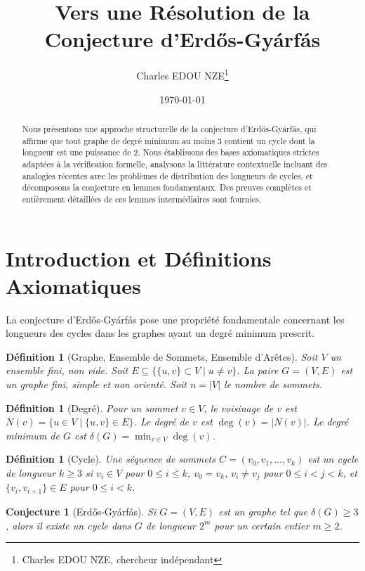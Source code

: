 \documentclass[11pt,a4paper]{article}
\title{Vers une R\'esolution de la Conjecture d'Erd\H{o}s-Gy\'arf\'as}
\author{Charles EDOU NZE\thanks{Charles EDOU NZE, chercheur ind\'ependant}}
\date{\today}
\newtheorem{definition}[theorem]{D\'efinition}
\newtheorem{conjecture}[theorem]{Conjecture}
\begin{document}
\maketitle

\begin{abstract}
Nous pr\'esentons une approche structurelle de la conjecture d'Erd\H{o}s-Gy\'arf\'as, qui affirme que tout graphe de degr\'e minimum au moins $3$ contient un cycle dont la longueur est une puissance de $2$. Nous \'etablissons des bases axiomatiques strictes adapt\'ees \`a la v\'erification formelle, analysons la litt\'erature contextuelle incluant des analogies r\'ecentes avec les probl\`emes de distribution des longueurs de cycles, et d\'ecomposons la conjecture en lemmes fondamentaux. Des preuves compl\`etes et enti\`erement d\'etaill\'ees de ces lemmes interm\'ediaires sont fournies.
\end{abstract}

\section{Introduction et D\'efinitions Axiomatiques}

La conjecture d'Erd\H{o}s-Gy\'arf\'as pose une propri\'et\'e fondamentale concernant les longueurs des cycles dans les graphes ayant un degr\'e minimum prescrit.

\begin{definition}[Graphe, Ensemble de Sommets, Ensemble d'Ar\^etes]
Soit $V$ un ensemble fini, non vide. Soit $E \subseteq \{ \{u, v\} \subset V \mid u \neq v \}$. La paire $G = (V, E)$ est un graphe fini, simple et non orient\'e. Soit $n = |V|$ le nombre de sommets.
\end{definition}

\begin{definition}[Degr\'e]
Pour un sommet $v \in V$, le voisinage de $v$ est $N(v) = \{u \in V \mid \{u, v\} \in E\}$. Le degr\'e de $v$ est $\deg(v) = |N(v)|$. Le degr\'e minimum de $G$ est $\delta(G) = \min_{v \in V} \deg(v)$.
\end{definition}

\begin{definition}[Cycle]
Une s\'equence de sommets $C = (v_0, v_1, \dots, v_k)$ est un cycle de longueur $k \ge 3$ si $v_i \in V$ pour $0 \le i \le k$, $v_0 = v_k$, $v_i \neq v_j$ pour $0 \le i < j < k$, et $\{v_i, v_{i+1}\} \in E$ pour $0 \le i < k$.
\end{definition}

\begin{conjecture}[Erd\H{o}s-Gy\'arf\'as]
Si $G = (V, E)$ est un graphe tel que $\delta(G) \ge 3$, alors il existe un cycle dans $G$ de longueur $2^m$ pour un certain entier $m \ge 2$.
\end{conjecture}
\end{document}
